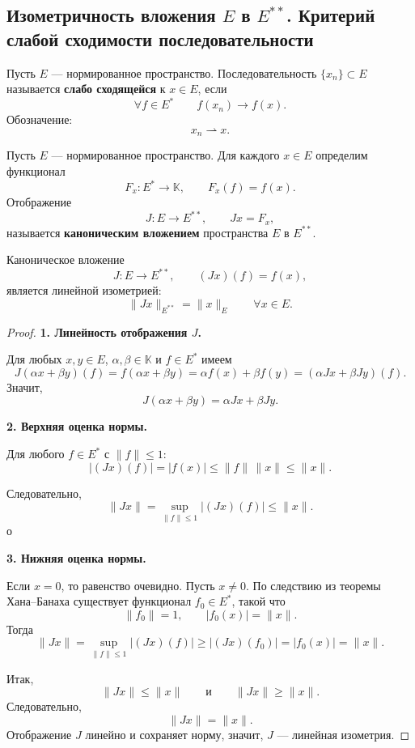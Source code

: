 \providecommand{\weakconv}{\rightharpoonup}
\providecommand{\K}{\mathbb{K}}

\subsection{Изометричность вложения \(E\) в \(E^{**}\). Критерий слабой сходимости последовательности}

\begin{definition}
	Пусть \(E\) --- нормированное пространство. Последовательность
	\(\{x_n\}\subset E\) называется \textbf{слабо сходящейся} к \(x\in E\), если
	\[
	\forall f\in E^*
	\qquad
	f(x_n)\to f(x).
	\]
	Обозначение:
	\[
	x_n\weakconv x.
	\]
\end{definition}

\begin{definition}
	Пусть \(E\) --- нормированное пространство. Для каждого \(x\in E\) определим функционал
	\[
	F_x:E^*\to\K,
	\qquad
	F_x(f)=f(x).
	\]
	Отображение
	\[
	J:E\to E^{**},
	\qquad
	Jx=F_x,
	\]
	называется \textbf{каноническим вложением} пространства \(E\) в \(E^{**}\).
\end{definition}

\begin{theorem}
	Каноническое вложение
	\[
	J:E\to E^{**},
	\qquad
	(Jx)(f)=f(x),
	\]
	является линейной изометрией:
	\[
	\|Jx\|_{E^{**}}=\|x\|_E
	\qquad
	\forall x\in E.
	\]
\end{theorem}

\begin{proof}
	
	\textbf{1. Линейность отображения \(J\).}
	
	Для любых \(x,y\in E\), \(\alpha,\beta\in\K\) и \(f\in E^*\) имеем
	\[
	J(\alpha x+\beta y)(f)
	=
	f(\alpha x+\beta y)
	=
	\alpha f(x)+\beta f(y)
	=
	(\alpha Jx+\beta Jy)(f).
	\]
	Значит,
	\[
	J(\alpha x+\beta y)=\alpha Jx+\beta Jy.
	\]
	
	\textbf{2. Верхняя оценка нормы.}
	
	Для любого \(f\in E^*\) с \(\|f\|\leqslant 1\):
	\[
	|(Jx)(f)|
	=
	|f(x)|
	\leqslant
	\|f\|\,\|x\|
	\leqslant
	\|x\|.
	\]
	
	Следовательно,
	\[
	\|Jx\|
	=
	\sup_{\|f\|\leqslant 1}|(Jx)(f)|
	\leqslant
	\|x\|.
	\]о
	
	\textbf{3. Нижняя оценка нормы.}
	
	Если \(x=0\), то равенство очевидно. Пусть \(x\ne0\). По следствию из теоремы Хана--Банаха
	существует функционал \(f_0\in E^*\), такой что
	\[
	\|f_0\|=1,
	\qquad
	|f_0(x)|=\|x\|.
	\]
	Тогда
	\[
	\|Jx\|
	=
	\sup_{\|f\|\leqslant1}|(Jx)(f)|
	\geqslant
	|(Jx)(f_0)|
	=
	|f_0(x)|
	=
	\|x\|.
	\]
	
	Итак,
	\[
	\|Jx\|\leqslant \|x\|
	\qquad
	\text{и}
	\qquad
	\|Jx\|\geqslant \|x\|.
	\]
	Следовательно,
	\[
	\|Jx\|=\|x\|.
	\]
	Отображение \(J\) линейно и сохраняет норму, значит, \(J\) --- линейная изометрия.
\end{proof}

